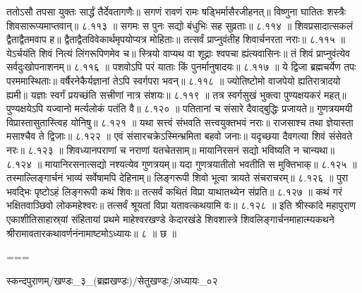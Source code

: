 ततोऽसौ तपसा युक्तः सार्द्धं तैर्देवतागणैः॥
सगणं रावणं रामः षड्भिर्मासैरजीहनत्॥
विष्णुना घातितः शस्त्रैः शिवसारूप्यमाप्तवान्॥ ८.११३ ॥
सगमः स पुनः सद्यो बंधुभिः सह सुव्रताः॥ ८.११४ ॥
शिवप्रसादात्सकलं द्वैताद्वैतमवाप ह॥
द्वैताद्वैतविवेकार्थमृपयोप्यत्र मोहिताः॥
तत्सर्वं प्राप्नुवंतीह शिवार्चनरता नराः॥ ८.११५ ॥
येऽर्चयंति शिवं नित्यं लिंगरूपिणमेव च॥
स्त्रियो वाप्यथ वा शूद्राः श्वपचा ह्यंत्यवासिनः॥
तं शिवं प्राप्नुवंत्येव सर्वदुःखोपनाशनम्॥ ८.११६ ॥
पशवोऽपि परं याताः किं पुनर्मानुषादयः॥ ८.११७ ॥
ये द्विजा ब्रह्मचर्येण तपः परममास्थिताः॥
वर्षैरनेकैर्यज्ञानां तेऽपि स्वर्गपरा भवन्॥ ८.११८ ॥
ज्योतिष्टोमो वाजपेयो ह्यतिरात्रादयो ह्यमी॥
यज्ञाः स्वर्गं प्रयच्छंति सत्त्रीणां नात्र संशयः॥ ८.११९ ॥
तत्र स्वर्गसुखं भुक्त्वा पुण्यक्षयकरं महत्॥
पुण्यक्षयेऽपि यज्वानो मर्त्यलोकं पतंति वै॥ ८.१२० ॥
पतितानां च संसारे दैवाद्बुद्धिः प्रजायते॥
गुणत्रयमयी विप्रास्तासुतास्त्विह योनिषु॥ ८.१२१ ॥
यथा सत्त्वं संभवति सत्त्वयुक्तभवं नराः॥
राजसाश्च तथा ज्ञेयास्ता मसाश्चैव ते द्विजाः॥ ८.१२२ ॥
एवं संसारचक्रेऽस्मिन्भ्रमिता बहवो जनाः॥
यदृच्छया दैवगत्या शिवं संसेवते नरः॥ ८.१२३ ॥
शिवध्यानपराणां च नराणां यतचेतसाम्॥
मायानिरसनं सद्यो भविष्यति न चान्यथा॥ ८.१२४ ॥
मायानिरसनात्सद्यो नश्यत्येव गुणत्रयम्॥
यदा गुणत्रयातीतो भवतीति स मुक्तिभाक्॥ ८.१२५ ॥
तस्माल्लिङ्गार्चनं भाव्यं सर्वेषामपि देहिनाम्॥
लिङ्गरूपी शिवो भूत्वा त्रायते संचराचरम्॥ ८.१२६ ॥
पुरा भवद्भिः पृष्टोऽहं लिङ्गरूपी कथं शिवः॥
तत्सर्वं कथितं विप्रा याथातथ्येन संप्रति॥ ८.१२७ ॥
कथं गरं भक्षितवाञ्छिवो लोकमहेश्वरः॥
तत्सर्वं श्रूयतां विप्रा यतावत्कथयामि वः॥ ८.१२८ ॥
इति श्रीस्कांदे महापुराण एकाशीतिसाहास्र्यां संहितायां प्रथमे माहेश्वरखण्डे केदारखंडे शिवशास्त्रे शिवलिङ्गार्चनमाहात्म्यकथने श्रीरामावतारकथावर्णनंनामाष्टमोऽध्यायः॥ ८ ॥ छ ॥


===

स्कन्दपुराणम्/खण्डः_३_(ब्रह्मखण्डः)/सेतुखण्डः/अध्यायः_०२


